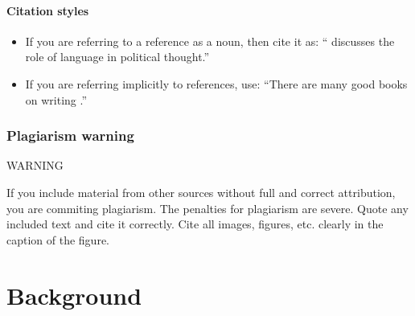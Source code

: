 \documentclass{l4proj}
\begin{document}
\subsubsection{Citation styles}

\begin{itemize}
\item If you are referring to a reference as a noun, then cite it as: ``\citet{Orw68} discusses the role of language in political thought.''
\item If you are referring implicitly to references, use: ``There are many good books on writing \citep{Orw68, Wil09, Pin15}.''
\end{itemize}
\subsection{Plagiarism warning}

\begin{highlight_title}{WARNING}
    
    If you include material from other sources without full and correct attribution, you are commiting plagiarism. The penalties for plagiarism are severe.
    Quote any included text and cite it correctly. Cite all images, figures, etc. clearly in the caption of the figure.
\end{highlight_title}


\chapter{Background}
\end{document}
